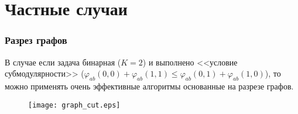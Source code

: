 \documentclass[smaller,unicode,hyperref={unicode=true}]{beamer}
\begin{document}

\section{Частные случаи}
\begin{frame}
  \frametitle{Разрез графов}
  В случае если задача бинарная ($K = 2$) и выполнено <<условие субмодулярности>> ($\varphi_{ab} (0, 0) + \varphi_{ab} (1, 1) \leq \varphi_{ab} (0, 1) + \varphi_{ab} (1, 0)$), то можно применять очень эффективные алгоритмы основанные на разрезе графов.
    \begin{figure}
      \texttt{[image: graph\_cut.eps]}
    \end{figure}
\end{frame}
\end{document}
